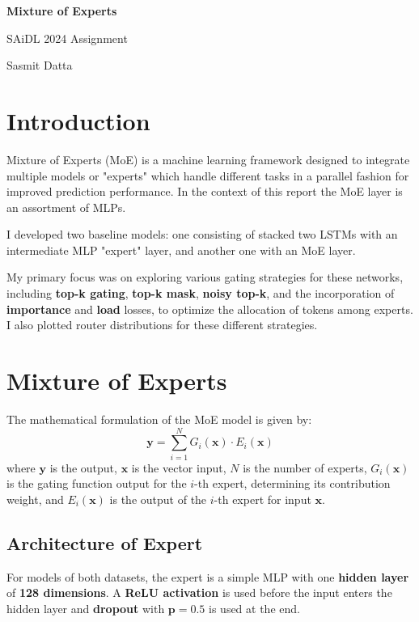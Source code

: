 \documentclass[12pt]{article}
\begin{document}
\begin{titlepage}
\centering
\vspace{0.5cm}
{\Huge\bfseries Mixture of Experts\par}

\vspace{0.5cm} %
{\Large SAiDL 2024 Assignment}

\vspace{1.5cm}
{\Large Sasmit Datta}
\end{titlepage}

\section{Introduction}
Mixture of Experts (MoE) is a machine learning framework designed to integrate multiple models or "experts" which handle different tasks in a parallel fashion for improved prediction performance. In the context of this report the MoE layer is an assortment of MLPs. 

I developed two baseline models: one consisting of stacked two LSTMs with an intermediate MLP "expert" layer, and another one with an MoE layer. 

My primary focus was on exploring various gating strategies for these networks, including \textbf{top-k gating}, \textbf{top-k mask}, \textbf{noisy top-k}, and the incorporation of \textbf{importance} and \textbf{load} losses, to optimize the allocation of tokens among experts. I also plotted router distributions for these different strategies.
\section{Mixture of Experts}
The mathematical formulation of the MoE model is given by:
\begin{equation}
\mathbf{y} = \sum_{i=1}^{N} G_i(\mathbf{x}) \cdot E_i(\mathbf{x})
\end{equation}
where $\mathbf{y}$ is the output, $\mathbf{x}$ is the vector input, $N$ is the number of experts, $G_i(\mathbf{x})$ is the gating function output for the $i$-th expert, determining its contribution weight, and $E_i(\mathbf{x})$ is the output of the $i$-th expert for input $\mathbf{x}$.
\subsection{Architecture of Expert}
For models of both datasets, the expert is a simple MLP with one \textbf{hidden layer} of \textbf{128 dimensions}. A \textbf{ReLU activation} is used before the input enters the hidden layer and \textbf{dropout} with $\boldsymbol{p=0.5}$ is used at the end.
\end{document}
